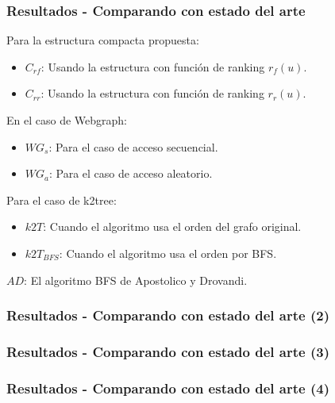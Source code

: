\begin{frame}
\frametitle{Resultados - Comparando con estado del arte}

Para la estructura compacta propuesta:
	\begin{itemize}
		\item $C_{rf}$: Usando la estructura con función de ranking $r_{f}(u)$.
		\item $C_{rr}$: Usando la estructura con función de ranking $r_{r}(u)$.
	\end{itemize}			

En el caso de Webgraph: 
	\begin{itemize}
		\item $WG_{s}$: Para el caso de acceso secuencial. 
		\item $WG_{a}$: Para el caso de acceso aleatorio.
	\end{itemize}
Para el caso de k2tree:
	\begin{itemize}
		\item $k2T$: Cuando el algoritmo usa el orden del grafo original.
		\item $k2T_{BFS}$: Cuando el algoritmo usa el orden por BFS.
	\end{itemize}			

$AD$: El algoritmo BFS de Apostolico y Drovandi.

\end{frame}

\begin{frame}
\frametitle{Resultados - Comparando con estado del arte (2)}

{\scriptsize

}

\end{frame}

\begin{frame}
\frametitle{Resultados - Comparando con estado del arte (3)}

{\footnotesize

}

\end{frame}

\begin{frame}
\frametitle{Resultados - Comparando con estado del arte (4)}

{\small

}

\end{frame}

